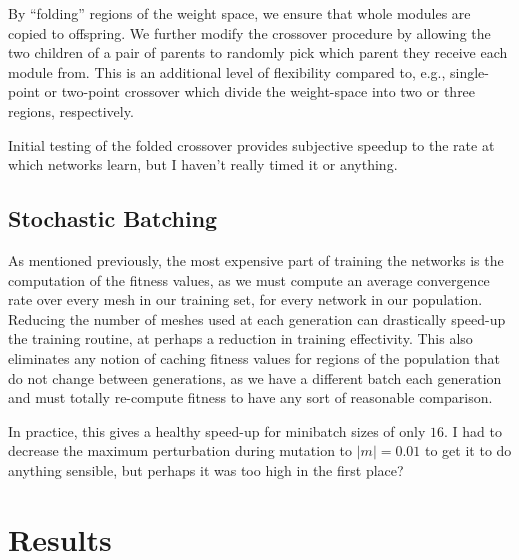 \documentclass{article}
\newcommand{\abs}[1]{\left\lvert#1\right\rvert}
\begin{document}
By ``folding'' regions of the weight space, we ensure that whole modules are copied to offspring.  We further modify the crossover procedure by allowing the two children of a pair of parents to randomly pick which parent they receive each module from.  This is an additional level of flexibility compared to, e.g., single-point or two-point crossover which divide the weight-space into two or three regions, respectively.

Initial testing of the folded crossover provides subjective speedup to the rate at which networks learn, but I haven't really timed it or anything.

\subsection{Stochastic Batching}
As mentioned previously, the most expensive part of training the networks is the computation of the fitness values, as we must compute an average convergence rate over every mesh in our training set, for every network in our population.  Reducing the number of meshes used at each generation can drastically speed-up the training routine, at perhaps a reduction in training effectivity.  This also eliminates any notion of caching fitness values for regions of the population that do not change between generations, as we have a different batch each generation and must totally re-compute fitness to have any sort of reasonable comparison.

In practice, this gives a healthy speed-up for minibatch sizes of only $16$.  I had to decrease the maximum perturbation during mutation to $\abs{m}=0.01$ to get it to do anything sensible, but perhaps it was too high in the first place?

\section{Results}
\end{document}
